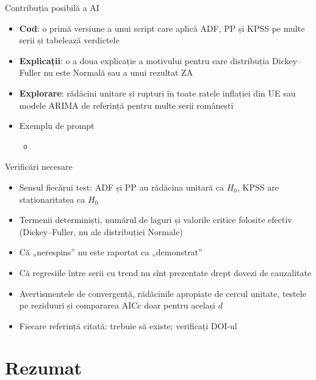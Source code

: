 \begin{frame}{Contribuția posibilă a AI}
\itemsize{\small}
\begin{itemize}
    \item \textbf{Cod}: o primă versiune a unui script care aplică ADF, PP și KPSS pe multe serii și tabelează verdictele
    \item \textbf{Explicații}: o a doua explicație a motivului pentru care distribuția Dickey--Fuller nu este Normală sau a unui rezultat ZA
    \item \textbf{Explorare}: rădăcini unitare și rupturi în toate ratele inflației din UE sau modele ARIMA de referință pentru multe serii românești
    \item Exemplu de prompt
    \begin{itemize}
        \item {}
    \end{itemize}
\end{itemize}
\end{frame}

\begin{frame}{Verificări necesare}
\itemsize{\small}
\begin{itemize}
    \item Sensul fiecărui test: ADF și PP au rădăcina unitară ca $H_0$, KPSS are staționaritatea ca $H_0$
    \item Termenii determiniști, numărul de laguri și valorile critice folosite efectiv (Dickey--Fuller, nu ale distribuției Normale)
    \item Că „nerespins” nu este raportat ca „demonstrat”
    \item Că regresiile între serii cu trend nu sînt prezentate drept dovezi de cauzalitate
    \item Avertismentele de convergență, rădăcinile apropiate de cercul unitate, testele pe reziduuri și compararea AICc doar pentru același $d$
    \item Fiecare referință citată: trebuie să existe; verificați DOI-ul
\end{itemize}
\end{frame}


\section{Rezumat}

